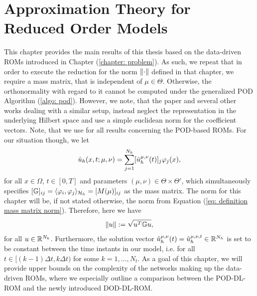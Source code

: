 \chapter{Approximation Theory for Reduced Order Models} \label{chapter: results}




This chapter provides the main results of this thesis based on the data-driven ROMs 
introduced in Chapter (\ref{chapter: problem}). As such, we repeat that in order to
execute the reduction for the norm $\lVert \cdot \rVert$ defined in that chapter,
we require a mass matrix, that is independent of $\mu \in \Theta$. Otherwise, the orthonormality 
with regard to it cannot be computed under the generalized POD Algorithm (\ref{algo: pod}). However, we note, 
that the paper \cite{brivio2023} and several other works dealing with a similar setup, instead
neglect the representation in the underlying Hilbert space and use a simple euclidean norm for the
coefficient vectors. Note, that we use \cite{brivio2023} for all results concerning the POD-based ROMs. 
For our situation though, we let
\begin{equation} \label{eq: representation uhat}
    \hat{u}_h(x, t; \mu, \nu) = \sum_{j=1}^{N_h} [\hat{u}_h^{\mu, \nu}(t)]_j \varphi_j(x),
\end{equation}  
for all $x \in \Omega$, $t \in [0, T]$ and parameters $(\mu, \nu) \in \Theta \times \Theta'$, which simultaneously 
specifies $[\mathbb{G}]_{ij} = \langle \varphi_i, \varphi_j \rangle_{\mathcal{H}_h} = [M(\mu)]_{ij}$ as the mass matrix. The norm for
this chapter will be, if not stated otherwise, the norm from Equation (\ref{eq: definition mass matrix norm}). Therefore,
here we have
\begin{equation*}
    \lVert u \rVert := \sqrt{u^T \mathbb{G} u},
\end{equation*} 
for all $u \in \mathbb{R}^{N_h}$.
Furthermore,
the solution vector $\hat{u}_h^{\mu, \nu}(t) = \hat{u}_h^{\mu, \nu, t} \in \mathbb{R}^{N_h}$ is set to be constant between the time instants 
in our model, i.e. for all
$t \in [(k-1) \Delta t, k \Delta t)$ for some $k = 1, \dots, N_t$.
As a goal of this chapter, we will provide upper bounds on the complexity of the networks
making up the data-driven ROMs, where we especially outline a comparison between the POD-DL-ROM and the newly
introduced DOD-DL-ROM.

